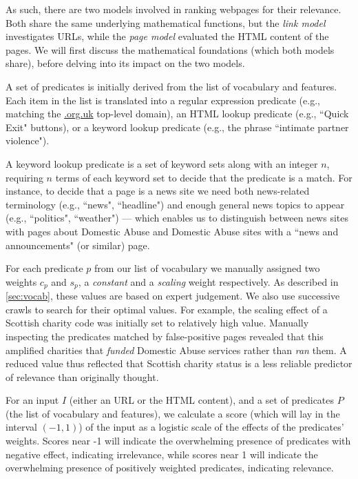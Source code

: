 \documentclass[conference]{IEEEtran}
\begin{document}
As such, there are two models involved in ranking webpages for their relevance. 
Both share the same underlying mathematical functions, but the \textit{link model} investigates URLs, while the \textit{page model} evaluated the HTML content of the pages. We will first discuss the mathematical foundations (which both models share), before delving into its impact on the two models.

A set of predicates is initially derived from the list of vocabulary and features. 
Each item in the list is translated into a regular expression predicate (e.g., matching the \url{.org.uk} top-level domain), an HTML lookup predicate (e.g., ``Quick Exit" buttons), or a keyword lookup predicate (e.g., the phrase ``intimate partner violence"). 

A keyword lookup predicate is a set of keyword sets along with an integer $n$, requiring $n$ terms of each keyword set to decide that the predicate is a match. 
For instance, to decide that a page is a news site we need both news-related terminology (e.g., ``news", ``headline") and enough general news topics to appear (e.g., ``politics", ``weather") --- which enables us to distinguish between news sites with pages about Domestic Abuse and Domestic Abuse sites with a ``news and announcements" (or similar) page.

For each predicate $p$ from our list of vocabulary we manually assigned two weights $c_p$ and $s_p$, a \textit{constant} and a \textit{scaling} weight respectively. 
As described in \cref{sec:vocab}, these values are based on expert judgement. 
We also use successive crawls to search for their optimal values. 
For example, the scaling effect of a Scottish charity code was initially set to relatively high value. 
Manually inspecting the predicates matched by false-positive pages revealed that this amplified charities that \textit{funded} Domestic Abuse services rather than \textit{ran} them. A reduced value thus reflected that Scottish charity status is a less reliable predictor of relevance than originally thought.

For an input $I$ (either an URL or the HTML content), and a set of predicates $P$ (the list of vocabulary and features), we calculate a score (which will lay in the interval $(-1,1)$) of the input as a logistic scale of the effects of the predicates' weights. Scores near -1 will indicate the overwhelming presence of predicates with negative effect, indicating irrelevance, while scores near 1 will indicate the overwhelming presence of positively weighted predicates, indicating relevance.
\end{document}
